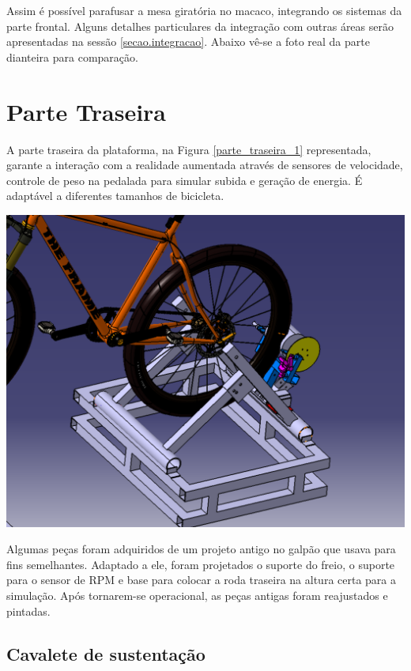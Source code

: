 	Assim é possível parafusar a mesa giratória no macaco, integrando os sistemas da parte frontal. Alguns detalhes particulares da integração com outras áreas serão apresentadas na sessão \ref{secao.integracao}. Abaixo vê-se a foto real da parte dianteira para comparação.


\section{Parte Traseira}
    A parte traseira da plataforma, na Figura \ref{parte_traseira_1} representada, garante a interação com a realidade aumentada através de sensores de velocidade, controle de peso na pedalada para simular subida e geração de energia. É adaptável a diferentes tamanhos de bicicleta.

    \begin{center}
    	\includegraphics[scale=0.5]{figuras/parte_traseira}
        \label{parte_traseira_1}
    \end{center}


   Algumas peças foram adquiridos de um projeto antigo no galpão que usava para fins semelhantes. Adaptado a ele, foram projetados o suporte do freio, o suporte para o sensor de RPM e base para colocar a roda traseira na altura certa para a simulação. Após tornarem-se operacional, as peças antigas foram reajustados e pintadas.

\subsection{Cavalete de sustentação}

